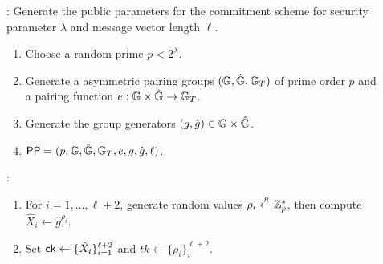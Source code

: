 \begin{description}
\item[]: Generate the public parameters for the commitment scheme for security parameter $\lambda$ and message vector length $\ell$. 
  \begin{enumerate}
  \item Choose a random prime $p< 2^{\lambda}$.
  \item Generate a asymmetric pairing groups $(\mathbb{G}, \hat{\mathbb{G}}, \mathbb{G}_T)$ of prime order $p$ and a pairing function $e : \mathbb{G} \times \hat{\mathbb{G}} \to \mathbb{G}_T$.
  \item Generate the group generators $(g, \hat{g}) \in \mathbb{G} \times \hat{\mathbb{G}}$.	
  \item $\mathsf{PP} = (p, \mathbb{G}, \hat{\mathbb{G}}, \mathbb{G}_T, e, g, \hat{g},\ell)$.
  \end{enumerate}

\item[]:
  \begin{enumerate}
  \item For $i = 1, \dots, \ell+2$, generate random values $\rho_i \stackrel{{\scriptscriptstyle \mkern4mu R}}{\gets} \mathbb{Z}_p^*$, then compute $\hat{X}_i \gets \hat{g}^{\rho_i}$.
  \item Set $\mathsf{ck} \gets \{\hat{X}_i\}_{i = 1}^{\ell+2}$ and $tk \gets \{\rho_i\}_i^{\ell+2}$.
  \end{enumerate}



\end{description}
